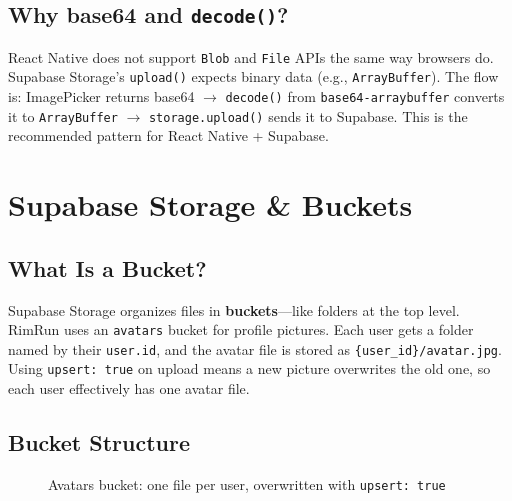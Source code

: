 \documentclass[11pt,a4paper]{article}
\begin{document}
\subsection{Why base64 and \texttt{decode()}?}

React Native does not support \texttt{Blob} and \texttt{File} APIs the same way browsers do. Supabase Storage's \texttt{upload()} expects binary data (e.g., \texttt{ArrayBuffer}). The flow is: ImagePicker returns base64 $\rightarrow$ \texttt{decode()} from \texttt{base64-arraybuffer} converts it to \texttt{ArrayBuffer} $\rightarrow$ \texttt{storage.upload()} sends it to Supabase. This is the recommended pattern for React Native + Supabase.

\section{Supabase Storage \& Buckets}

\subsection{What Is a Bucket?}

Supabase Storage organizes files in \textbf{buckets}---like folders at the top level. RimRun uses an \texttt{avatars} bucket for profile pictures. Each user gets a folder named by their \texttt{user.id}, and the avatar file is stored as \texttt{\{user\_id\}/avatar.jpg}. Using \texttt{upsert: true} on upload means a new picture overwrites the old one, so each user effectively has one avatar file.

\subsection{Bucket Structure}

\begin{figure}[h]
\centering
{}
\caption{Avatars bucket: one file per user, overwritten with \texttt{upsert: true}}
\end{figure}
\end{document}
